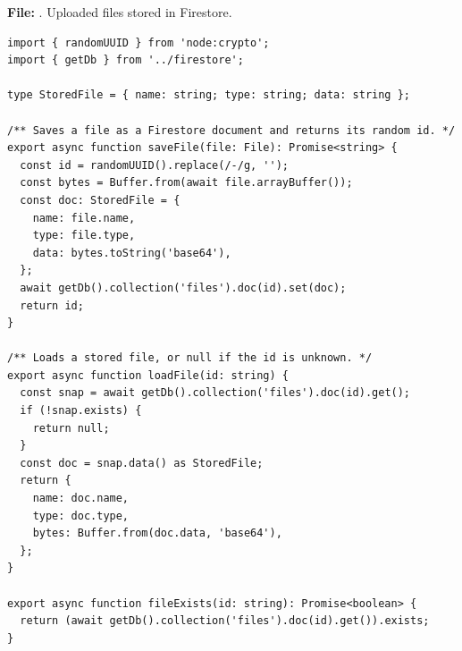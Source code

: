 \documentclass[11pt,a4paper]{article}
\begin{document}
\textbf{File:} . Uploaded files stored in Firestore.\par
\begin{lstlisting}
import { randomUUID } from 'node:crypto';
import { getDb } from '../firestore';

type StoredFile = { name: string; type: string; data: string };

/** Saves a file as a Firestore document and returns its random id. */
export async function saveFile(file: File): Promise<string> {
  const id = randomUUID().replace(/-/g, '');
  const bytes = Buffer.from(await file.arrayBuffer());
  const doc: StoredFile = {
    name: file.name,
    type: file.type,
    data: bytes.toString('base64'),
  };
  await getDb().collection('files').doc(id).set(doc);
  return id;
}

/** Loads a stored file, or null if the id is unknown. */
export async function loadFile(id: string) {
  const snap = await getDb().collection('files').doc(id).get();
  if (!snap.exists) {
    return null;
  }
  const doc = snap.data() as StoredFile;
  return {
    name: doc.name,
    type: doc.type,
    bytes: Buffer.from(doc.data, 'base64'),
  };
}

export async function fileExists(id: string): Promise<boolean> {
  return (await getDb().collection('files').doc(id).get()).exists;
}
\end{lstlisting}
\end{document}
